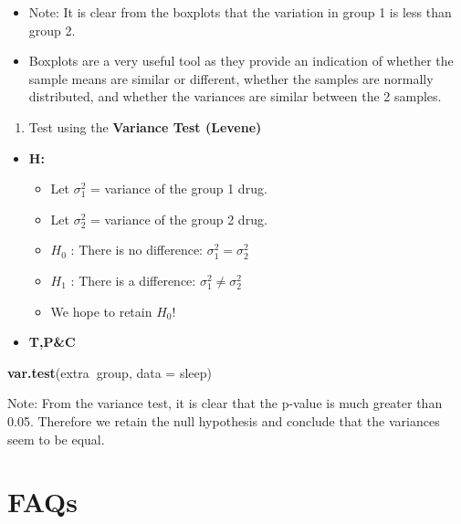 \documentclass[]{article}
\newenvironment{Shaded}{\begin{snugshade}}{\end{snugshade}}
\newcommand{\DataTypeTok}[1]{\textcolor[rgb]{0.13,0.29,0.53}{#1}}
\newcommand{\KeywordTok}[1]{\textcolor[rgb]{0.13,0.29,0.53}{\textbf{#1}}}
\newcommand{\NormalTok}[1]{#1}
\newcommand{\OperatorTok}[1]{\textcolor[rgb]{0.81,0.36,0.00}{\textbf{#1}}}
\providecommand{\tightlist}{%
  \setlength{\itemsep}{0pt}\setlength{\parskip}{0pt}}
\begin{document}
\begin{itemize}
\item
  Note: It is clear from the boxplots that the variation in group 1 is less than group 2.
\item
  Boxplots are a very useful tool as they provide an indication of whether the sample means are similar or different, whether the samples are normally distributed, and whether the variances are similar between the 2 samples.
\end{itemize}

\begin{enumerate}
\def\labelenumi{(\arabic{enumi})}
\setcounter{enumi}{1}
\tightlist
\item
  Test using the \textbf{Variance Test (Levene)}
\end{enumerate}

\begin{itemize}
\item
  \textbf{H:}

  \begin{itemize}
  \item
    Let \(\sigma_1^2\) = variance of the group 1 drug.
  \item
    Let \(\sigma_2^2\) = variance of the group 2 drug.
  \item
    \(H_{0}\) : There is no difference: \(\sigma_1^2=\sigma_2^2\)
  \item
    \(H_{1}\) : There is a difference: \(\sigma_1^2 \neq \sigma_2^2\)
  \item
    We hope to retain \(H_{0}\)!
  \end{itemize}
\item
  \textbf{T,P\&C}
\end{itemize}

\begin{Shaded}
\begin{Highlighting}[]
\KeywordTok{var.test}\NormalTok{(extra}\OperatorTok{~}\NormalTok{group, }\DataTypeTok{data =}\NormalTok{ sleep)}
\end{Highlighting}
\end{Shaded}

Note: From the variance test, it is clear that the p-value is much greater than 0.05. Therefore we retain the null hypothesis and conclude that the variances seem to be equal.

\hypertarget{faq}{%
\section{FAQs}\label{faq}}
\end{document}

